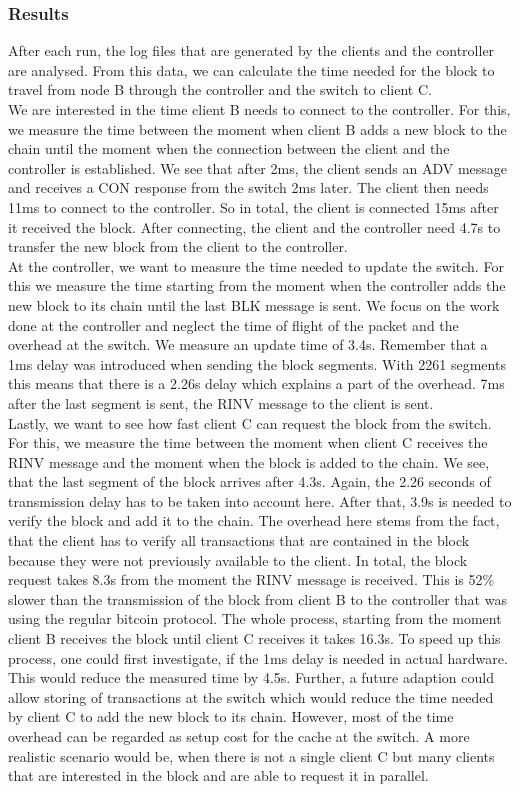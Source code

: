 \subsubsection{Results}
After each run, the log files that are generated by the clients and the controller are analysed. From this data, we can calculate the time needed for the block to travel from node B through the controller and the switch to client C.\\
We are interested in the time client B needs to connect to the controller. For this, we measure the time between the moment when client B adds a new block to the chain until the moment when the connection between the client and the controller is established. We see that after 2ms, the client sends an ADV message and receives a CON response from the switch 2ms later. The client then needs 11ms to connect to the controller. So in total, the client is connected 15ms after it received the block. After connecting, the client and the controller need 4.7s to transfer the new block from the client to the controller.\\
At the controller, we want to measure the time needed to update the switch. For this we measure the time starting from the moment when the controller adds the new block to its chain until the last BLK message is sent. We focus on the work done at the controller and neglect the time of flight of the packet and the overhead at the switch. We measure an update time of 3.4s. Remember that a 1ms delay was introduced when sending the block segments. With 2261 segments this means that there is a 2.26s delay which explains a part of the overhead. 7ms after the last segment is sent, the RINV message to the client is sent.\\
Lastly, we want to see how fast client C can request the block from the switch. For this, we measure the time between the moment when client C receives the RINV message and the moment when the block is added to the chain. We see, that the last segment of the block arrives after 4.3s. Again, the 2.26 seconds of transmission delay has to be taken into account here. After that, 3.9s is needed to verify the block and add it to the chain. The overhead here stems from the fact, that the client has to verify all transactions that are contained in the block because they were not previously available to the client. In total, the block request takes 8.3s from the moment the RINV message is received. This is 52\% slower than the transmission of the block from client B to the controller that was using the regular bitcoin protocol. 
The whole process, starting from the moment client B receives the block until client C receives it takes 16.3s. To speed up this process, one could first investigate, if the 1ms delay is needed in actual hardware. This would reduce the measured time by 4.5s. Further, a future adaption could allow storing of transactions at the switch which would reduce the time needed by client C to add the new block to its chain. However, most of the time overhead can be regarded as setup cost for the cache at the switch. A more realistic scenario would be, when there is not a single client C but many clients that are interested in the block and are able to request it in parallel.

